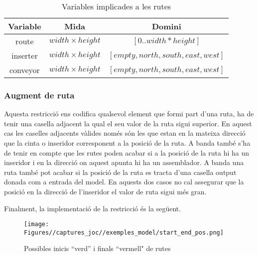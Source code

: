 \begin{table}[h]
    \centering
    \begin{tabular}{|c|c|c|}
    \hline
    \textbf{Variable} & \textbf{Mida} & \textbf{Domini} \\
    \hline
    route & $width \times height$ & $[0..width*height]$ \\
    \hline
    inserter & $width \times height$ & $[empty, north, south, east, west]$ \\
    \hline
    conveyor & $width \times height$ & $[empty, north, south, east, west]$ \\
    \hline
    \end{tabular}
    \caption{Variables implicades a les rutes}
    \label{route-variables}
\end{table}

\subsubsection{Augment de ruta}
Aquesta restricció ens codifica qualsevol element que formi part d'una ruta, ha de tenir una casella adjacent la qual el seu valor de la ruta sigui superior. En aquest cas les caselles adjacents vàlides només són les que estan en la mateixa direcció que la cinta o inseridor corresponent a la posició de la ruta. A banda també s'ha de tenir en compte que les rutes poden acabar si a la posició de la ruta hi ha un inseridor i en la direcció on aquest apunta hi ha un assemblador. A banda una ruta també pot acabar si la posició de la ruta es tracta d'una casella output donada com a entrada del model. En aquests dos casos no cal assegurar que la posició en la direcció de l'inseridor el valor de ruta sigui més gran. 

Finalment, la implementació de la restricció és la següent.
\begin{figure}
    \centering
    \texttt{[image: Figures//captures\_joc//exemples\_model/start\_end\_pos.png]}
    \caption{Possibles inicis ``verd'' i finals ``vermell" de rutes}
    \label{fig:start_end_route}
\end{figure}

